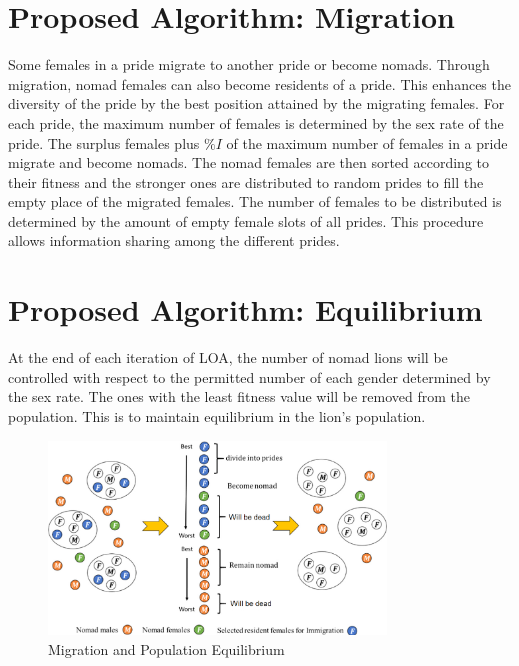 \section{Proposed Algorithm: Migration}
Some females in a pride migrate to another pride or become nomads. Through migration, nomad females can also become residents of a pride. This enhances the diversity of the pride by the best position attained by the migrating females. For each pride, the maximum number of females is determined by the sex rate of the pride. The surplus females plus $\%I$ of the maximum number of females in a pride migrate and become nomads. The nomad females are then sorted according to their fitness and the stronger ones are distributed to random prides to fill the empty place of the migrated females. The number of females to be distributed is determined by the amount of empty female slots of all prides. This procedure allows information sharing among the different prides.

\section{Proposed Algorithm: Equilibrium}
At the end of each iteration of LOA, the number of nomad lions will be controlled with respect to the permitted number of each gender determined by the sex rate. The ones with the least fitness value will be removed from the population. This is to maintain equilibrium in the lion's population.

\begin{figure}[H]
\begin{center}
\includegraphics[width=0.8\textwidth]{img/equilibrium/equilibrium}
\caption{Migration and Population Equilibrium}
\end{center}
\end{figure}


